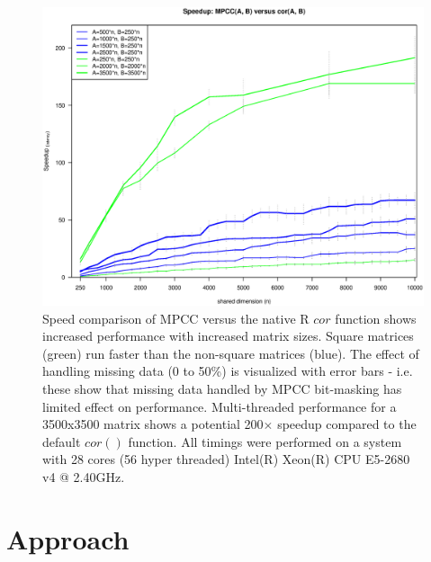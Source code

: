 \documentclass{bioinfo}
\begin{document}
\begin{figure}[H]
\centering
\includegraphics[width=\linewidth]{img/figure02new.eps}
  \caption{ \small Speed comparison of MPCC versus the native R $cor$
  function shows increased performance with increased matrix
  sizes. Square matrices (green) run faster than the non-square
  matrices (blue).  The effect of handling missing data (0 to 50\%) is
  visualized with error bars - i.e. these show that missing data
  handled by MPCC bit-masking has limited effect on performance.
  Multi-threaded performance for a 3500x3500 matrix shows a potential
  200$\times$ speedup compared to the default $cor()$ function.  All
  timings were performed on a system with 28 cores (56 hyper threaded)
  Intel(R) Xeon(R) CPU E5-2680 v4 @ 2.40GHz.  } \label{fig:fig2}
\end{figure}

\vspace*{-10mm}


\section{Approach}
\end{document}
